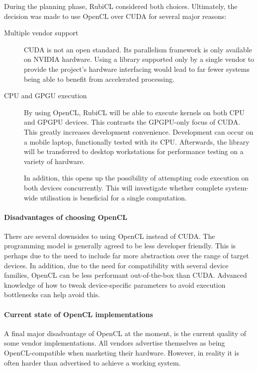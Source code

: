 During the planning phase, RubiCL considered both choices. Ultimately, the decision was made to use \ac{OpenCL} over \ac{CUDA} for several major reasons:

\begin{description}
  \item[Multiple vendor support]
    \ac{CUDA} is not an open standard. Its parallelism framework is only available on NVIDIA hardware. Using a library supported only by a single vendor to provide the project's hardware interfacing would lead to far fewer systems being able to benefit from accelerated processing.

  \item[CPU and GPGU execution]
    By using \ac{OpenCL}, RubiCL will be able to execute kernels on both \ac{CPU} and \ac{GPGPU} devices. This contrasts the \ac{GPGPU}-only focus of \ac{CUDA}.
    This greatly increases development convenience. Development can occur on a mobile laptop, functionally tested with its \ac{CPU}. Afterwards, the library will be transferred to desktop workstations for performance testing on a variety of hardware.

    In addition, this opens up the possibility of attempting code execution on both devices concurrently. This will investigate whether complete system-wide utilisation is beneficial for a single computation.
  \end{description}

  \paragraph*{Disadvantages of choosing \ac{OpenCL}}
  There are several downsides to using \ac{OpenCL} instead of \ac{CUDA}. The programming model is generally agreed to be less developer friendly. This is perhaps due to the need to include far more abstraction over the range of target devices. In addition, due to the need for compatibility with several device families, \ac{OpenCL} can be less performant out-of-the-box than \ac{CUDA}. Advanced knowledge of how to tweak device-specific parameters to avoid execution bottlenecks can help avoid this.

  \paragraph*{Current state of OpenCL implementations}
  A final major disadvantage of \ac{OpenCL} at the moment, is the current quality of some vendor implementations. All vendors advertise themselves as being \ac{OpenCL}-compatible when marketing their hardware. However, in reality it is often harder than advertised to achieve a working system.

